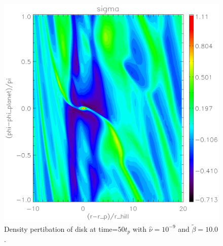 \begin{figure}
   \includegraphics[scale=.60]{figures/analysis_sigma50highb.ps}
   \caption{Density pertibation of disk at time=$50t_p$ with $\hat{\nu}=10^{-9}$ and $\tilde{\beta}=10.0$. }
 \label{shortterm_highb)}
 \end{figure}










